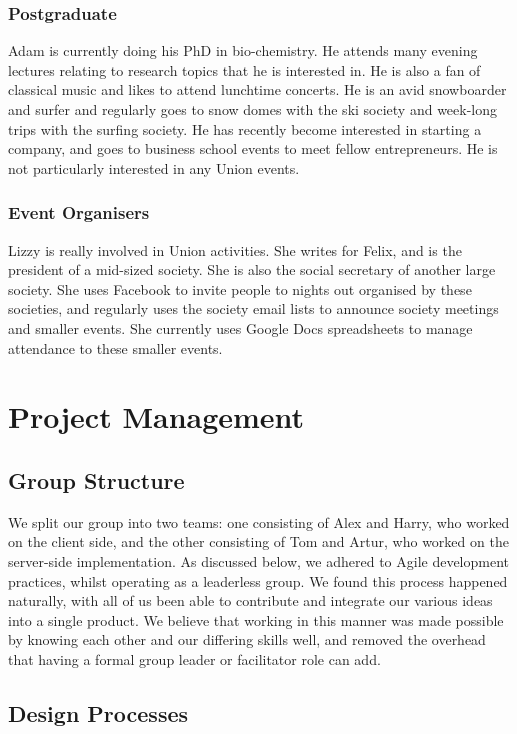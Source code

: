 \documentclass[11pt]{article}
\begin{document}
\subsubsection{Postgraduate}
Adam is currently doing his PhD in bio-chemistry. He attends many evening lectures relating to research topics that he is interested in. He is also a fan of classical music and likes to attend lunchtime concerts. He is an avid snowboarder and surfer and regularly goes to snow domes with the ski society and week-long trips with the surfing society. He has recently become interested in starting a company, and goes to business school events to meet fellow entrepreneurs. He is not particularly interested in any Union events.

\subsubsection{Event Organisers}
Lizzy is really involved in Union activities. She writes for Felix, and is the president of a mid-sized society. She is also the social secretary of another large society. She uses Facebook to invite people to nights out organised by these societies, and regularly uses the society email lists to announce society meetings and smaller events. She currently uses Google Docs spreadsheets to manage attendance to these smaller events.
\section {Project Management}

\subsection {Group Structure}

We split our group into two teams: one consisting of Alex and Harry, who worked on the client side, and the other consisting of Tom and Artur, who worked on the server-side implementation. As discussed below, we adhered to Agile development practices, whilst operating as a leaderless group. We found this process happened naturally, with all of us been able to contribute and integrate our various ideas into a single product. We believe that working in this manner was made possible by knowing each other and our differing skills well, and removed the overhead that having a formal group leader or facilitator role can add.

\subsection {Design Processes}
\end{document}
